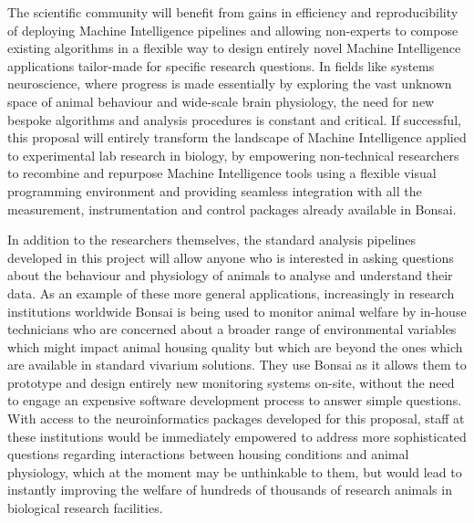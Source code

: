The scientific community will benefit from gains in efficiency and reproducibility of deploying Machine Intelligence pipelines and allowing non-experts to compose existing algorithms in a flexible way to design entirely novel Machine Intelligence applications tailor-made for specific research questions. In fields like systems neuroscience, where progress is made essentially by exploring the vast unknown space of animal behaviour and wide-scale brain physiology, the need for new bespoke algorithms and analysis procedures is constant and critical. If successful, this proposal will entirely transform the landscape of Machine Intelligence applied to experimental lab research in biology, by empowering non-technical researchers to recombine and repurpose Machine Intelligence tools using a flexible visual programming environment and providing seamless integration with all the measurement, instrumentation and control packages already available in Bonsai.

In addition to the researchers themselves, the standard analysis pipelines developed in this project will allow anyone who is interested in asking questions about the behaviour and physiology of animals to analyse and understand their data. As an example of these more general applications, increasingly in research institutions worldwide Bonsai is being used to monitor animal welfare by in-house technicians who are concerned about a broader range of environmental variables which might impact animal housing quality but which are beyond the ones which are available in standard vivarium solutions. They use Bonsai as it allows them to prototype and design entirely new monitoring systems on-site, without the need to engage an expensive software development process to answer simple questions. With access to the neuroinformatics packages developed for this proposal, staff at these institutions would be immediately empowered to address more sophisticated questions regarding interactions between housing conditions and animal physiology, which at the moment may be unthinkable to them, but would lead to instantly improving the welfare of hundreds of thousands of research animals in biological research facilities.


